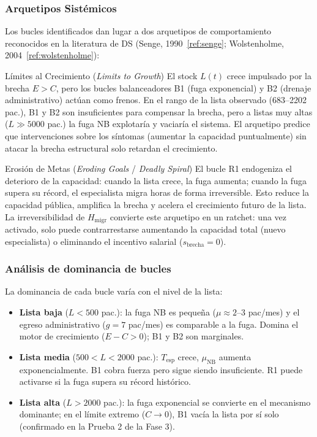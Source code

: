 \documentclass[12pt,a4paper]{article}
\begin{document}
\subsubsection*{Arquetipos Sistémicos}

Los bucles identificados dan lugar a dos arquetipos de comportamiento reconocidos en la literatura de DS (Senge, 1990~\ref{ref:senge}; Wolstenholme, 2004~\ref{ref:wolstenholme}):

\begin{arquetipobox}{Límites al Crecimiento (\textit{Limits to Growth})}
  El stock $L(t)$ crece impulsado por la brecha $E > C$, pero los bucles balanceadores B1 (fuga exponencial) y B2 (drenaje administrativo) actúan como frenos. En el rango de la lista observado (683--2202 pac.), B1 y B2 son insuficientes para compensar la brecha, pero a listas muy altas ($L \gg 5000$ pac.) la fuga NB explotaría y vaciaría el sistema. El arquetipo predice que intervenciones sobre los síntomas (aumentar la capacidad puntualmente) sin atacar la brecha estructural solo retardan el crecimiento.
\end{arquetipobox}

\begin{arquetipobox}{Erosión de Metas (\textit{Eroding Goals} / \textit{Deadly Spiral})}
  El bucle R1 endogeniza el deterioro de la capacidad: cuando la lista crece, la fuga aumenta; cuando la fuga supera su récord, el especialista migra horas de forma irreversible. Esto reduce la capacidad pública, amplifica la brecha y acelera el crecimiento futuro de la lista. La irreversibilidad de $H_{\text{migr}}$ convierte este arquetipo en un ratchet: una vez activado, solo puede contrarrestarse aumentando la capacidad total (nuevo especialista) o eliminando el incentivo salarial ($s_{\text{brecha}} = 0$).
\end{arquetipobox}

\subsubsection*{Análisis de dominancia de bucles}

La dominancia de cada bucle varía con el nivel de la lista:

\begin{itemize}[leftmargin=1.5cm]
  \item \textbf{Lista baja} ($L < 500$ pac.): la fuga NB es pequeña ($\mu \approx 2$--$3$ pac/mes) y el egreso administrativo ($g = 7$ pac/mes) es comparable a la fuga. Domina el motor de crecimiento ($E - C > 0$); B1 y B2 son marginales.
  \item \textbf{Lista media} ($500 < L < 2000$ pac.): $T_{\text{esp}}$ crece, $\mu_{\text{NB}}$ aumenta exponencialmente. B1 cobra fuerza pero sigue siendo insuficiente. R1 puede activarse si la fuga supera su récord histórico.
  \item \textbf{Lista alta} ($L > 2000$ pac.): la fuga exponencial se convierte en el mecanismo dominante; en el límite extremo ($C \to 0$), B1 vacía la lista por sí solo (confirmado en la Prueba 2 de la Fase 3).
\end{itemize}
\end{document}
